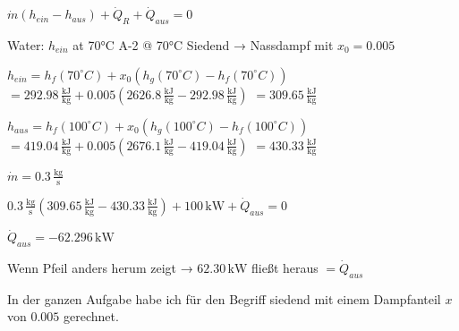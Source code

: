 \( \dot{m}(h_{ein} - h_{aus}) + \dot{Q}_R + \dot{Q}_{aus} = 0 \)  

Water:  
\( h_{ein} \) at 70°C  
A-2 @ 70°C  
Siedend → Nassdampf mit \( x_0 = 0.005 \)  

\( h_{ein} = h_f(70^\circ C) + x_0(h_g(70^\circ C) - h_f(70^\circ C)) \)  
\( = 292.98 \, \frac{\text{kJ}}{\text{kg}} + 0.005(2626.8 \, \frac{\text{kJ}}{\text{kg}} - 292.98 \, \frac{\text{kJ}}{\text{kg}}) \)  
\( = 309.65 \, \frac{\text{kJ}}{\text{kg}} \)  

\( h_{aus} = h_f(100^\circ C) + x_0(h_g(100^\circ C) - h_f(100^\circ C)) \)  
\( = 419.04 \, \frac{\text{kJ}}{\text{kg}} + 0.005(2676.1 \, \frac{\text{kJ}}{\text{kg}} - 419.04 \, \frac{\text{kJ}}{\text{kg}}) \)  
\( = 430.33 \, \frac{\text{kJ}}{\text{kg}} \)  

\( \dot{m} = 0.3 \, \frac{\text{kg}}{\text{s}} \)  

\( 0.3 \, \frac{\text{kg}}{\text{s}} (309.65 \, \frac{\text{kJ}}{\text{kg}} - 430.33 \, \frac{\text{kJ}}{\text{kg}}) + 100 \, \text{kW} + \dot{Q}_{aus} = 0 \)  

\( \dot{Q}_{aus} = -62.296 \, \text{kW} \)  

Wenn Pfeil anders herum zeigt →  
\( 62.30 \, \text{kW} \) fließt heraus  
\( = \dot{Q}_{aus} \)  

In der ganzen Aufgabe habe ich für den Begriff siedend mit einem Dampfanteil \( x \) von \( 0.005 \) gerechnet.